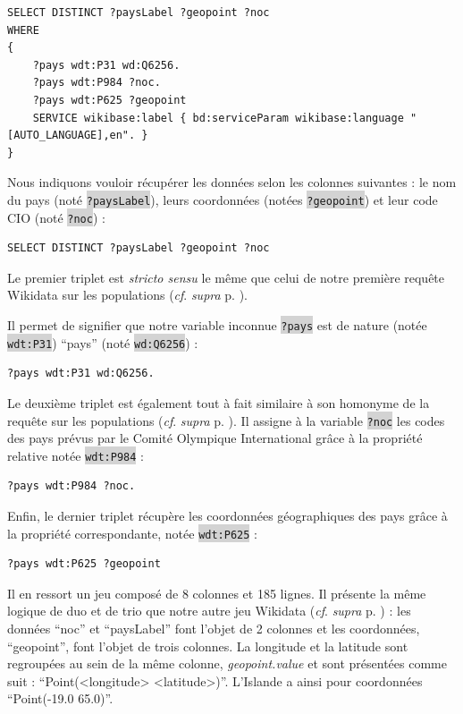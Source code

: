 \documentclass[hidelinks, 12pt]{article}
\newcommand{\code}[1]{\colorbox{LightGray}{\texttt{#1}}}
\begin{document}
\begin{lstlisting}[language=SPARQL]
SELECT DISTINCT ?paysLabel ?geopoint ?noc
WHERE 
{
	?pays wdt:P31 wd:Q6256.
	?pays wdt:P984 ?noc.
	?pays wdt:P625 ?geopoint
	SERVICE wikibase:label { bd:serviceParam wikibase:language "[AUTO_LANGUAGE],en". }
}
\end{lstlisting}

Nous indiquons vouloir récupérer les données selon les colonnes suivantes : le nom du pays (noté \code{?paysLabel}), leurs coordonnées (notées \code{?geopoint}) et leur code CIO (noté \code{?noc}) :

\begin{lstlisting}[language=SPARQL]
	SELECT DISTINCT ?paysLabel ?geopoint ?noc
\end{lstlisting}

Le premier triplet est \textit{stricto sensu} le même que celui de notre première requête Wikidata sur les populations (\textit{cf}. \textit{supra} p. \pageref{query1}).

Il permet de signifier que notre variable inconnue \code{?pays} est de nature (notée \code{wdt:P31}) \enquote{pays} (noté \code{wd:Q6256}) :

\begin{lstlisting}[language=SPARQL]
	?pays wdt:P31 wd:Q6256.
\end{lstlisting}

Le deuxième triplet est également tout à fait similaire à son homonyme de la requête sur les populations (\textit{cf}. \textit{supra} p. \pageref{query1}). Il assigne à la variable \code{?noc} les codes des pays prévus par le Comité Olympique International grâce à la propriété relative notée \code{wdt:P984} :

\begin{lstlisting}[language=SPARQL]
	?pays wdt:P984 ?noc.
\end{lstlisting}

Enfin, le dernier triplet récupère les coordonnées géographiques des pays grâce à la propriété correspondante, notée \code{wdt:P625} :

\begin{lstlisting}[language=SPARQL]
	?pays wdt:P625 ?geopoint
\end{lstlisting}

Il en ressort un jeu composé de 8 colonnes et 185 lignes. Il présente la même logique de duo et de trio que notre autre jeu Wikidata (\textit{cf}. \textit{supra} p. \pageref{query1tab}) : les données \enquote{noc} et \enquote{paysLabel} font l'objet de 2 colonnes et les coordonnées, \enquote{geopoint}, font l'objet de trois colonnes. La longitude et la latitude sont regroupées au sein de la même colonne, \textit{geopoint.value} et sont présentées comme suit : \enquote{Point(<longitude> <latitude>)}. L'Islande a ainsi pour coordonnées \enquote{Point(-19.0 65.0)}.
\end{document}
